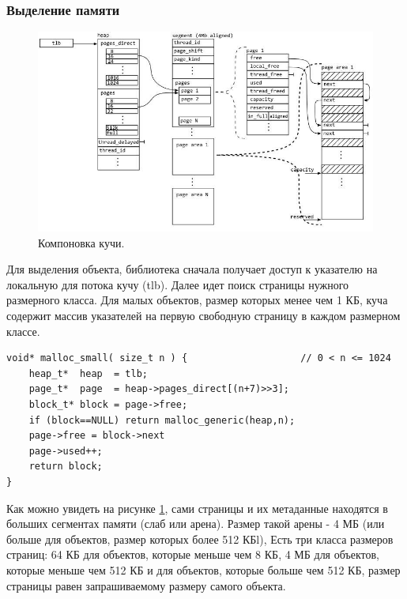 \subsubsection{Выделение памяти}
\begin{figure}[!h]
	\begin{center}
		\includegraphics[scale=0.8]{images/mimalloc-design-overview.jpg}
		\caption{Компоновка кучи.}
		\label{mimalloc-design-overview}
	\end{center}
\end{figure}

Для выделения объекта, библиотека сначала получает доступ к указателю на локальную для потока кучу (tlb). Далее идет поиск страницы нужного размерного класса. Для малых объектов, размер которых менее чем 1 КБ, куча содержит массив указателей на первую свободную страницу в каждом размерном классе.

\pagebreak

\begin{lstlisting}
void* malloc_small( size_t n ) {                    // 0 < n <= 1024
	heap_t*  heap  = tlb;
	page_t*  page  = heap->pages_direct[(n+7)>>3];
	block_t* block = page->free;
	if (block==NULL) return malloc_generic(heap,n);
	page->free = block->next
	page->used++;
	return block;
}
\end{lstlisting}

Как можно увидеть на рисунке \ref{mimalloc-design-overview}, сами страницы и их метаданные находятся в больших сегментах памяти (слаб или арена). Размер такой арены - 4 МБ (или больше для объектов, размер которых более 512 КБl), Есть три класса размеров страниц: 64 КБ для объектов, которые меньше чем 8 КБ, 4 МБ для объектов, которые меньше чем 512 КБ и для объектов, которые больше чем 512 КБ, размер страницы равен запрашиваемому размеру самого объекта.

